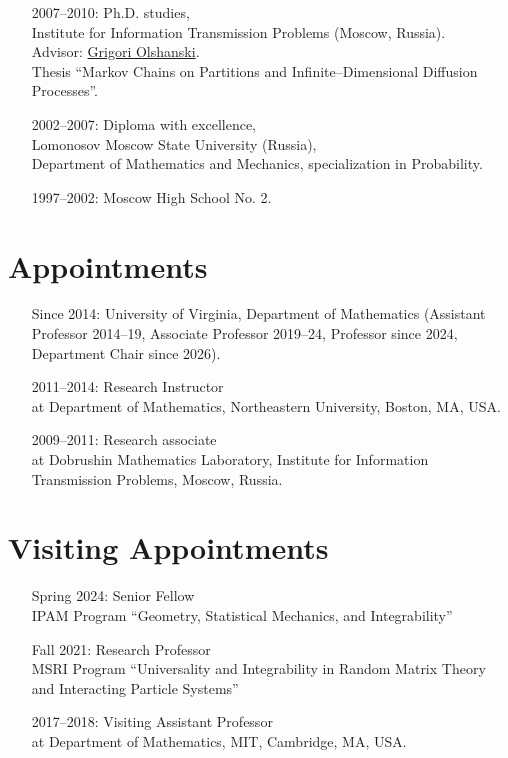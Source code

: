 \documentclass[letterpaper,11pt]{article}
\begin{document}
\begin{itemize}
	\item
	      [2007--2010:]
	      Ph.D. studies,\\Institute for Information Transmission Problems
	      (Moscow, Russia). \\ Advisor:
	      \href{http://www.iitp.ru/en/userpages/88/}{Grigori Olshanski}.\\ Thesis
	      ``Markov Chains on Partitions and Infinite--Dimensional Diffusion Processes''.

	\item
	      [2002--2007:]
	      Diploma with excellence,\\ Lomonosov Moscow State University
	      (Russia),\\ Department of Mathematics and Mechanics, specialization in Probability.

	\item
	      [1997--2002:] Moscow High School No. 2.
\end{itemize}

\section*{Appointments}

\begin{itemize}
	\item
	[Since 2014:]
	University of Virginia, Department of Mathematics
	(Assistant Professor 2014--19, Associate Professor 2019--24, Professor since 2024, Department Chair since 2026).
	\item
	      [2011--2014:]
	      Research Instructor\\ at Department of Mathematics, Northeastern
	      University, Boston, MA, USA.
	\item
	      [2009--2011:]
	      Research associate\\ at Dobrushin Mathematics Laboratory,
	      Institute for Information Transmission Problems, Moscow, Russia.
\end{itemize}

\section*{Visiting Appointments}

\begin{itemize}
	\item [Spring 2024:]
		  Senior Fellow
		  \\
		  IPAM Program ``Geometry, Statistical Mechanics, and Integrability''
	\item [Fall 2021:]
		  Research Professor
		  \\
		  MSRI Program ``Universality and Integrability in Random Matrix Theory and Interacting Particle Systems''
	\item
	      [2017--2018:]
	      Visiting Assistant Professor\\ at Department of Mathematics, MIT,
	      Cambridge, MA, USA.
\end{itemize}
\end{document}

